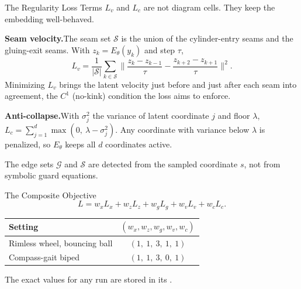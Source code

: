 \documentclass[10pt,aspectratio=169]{beamer}
\newcommand{\code}[1]{\texttt{\small\detokenize{#1}}}
\begin{document}
\begin{frame}{The Regularity Loss Terms}
  \small
  \(L_v\) and \(L_c\) are not diagram cells. They keep the embedding
  well-behaved.

  \medskip
  \textbf{Seam velocity.}\quad The seam set \(\mathcal{S}\) is the union of
  the cylinder-entry seams and the gluing-exit seams. With
  \(z_k = E_\theta(y_k)\) and step \(\tau\),
  \[ L_v = \frac{1}{|\mathcal{S}|}\sum_{k\in\mathcal{S}}
     \Big\lVert \frac{z_k - z_{k-1}}{\tau}
       - \frac{z_{k+2} - z_{k+1}}{\tau}\Big\rVert^2 . \]
  Minimizing \(L_v\) brings the latent velocity just before and just after
  each seam into agreement, the \(C^1\) (no-kink) condition the loss aims to
  enforce.

  \medskip
  \textbf{Anti-collapse.}\quad With \(\sigma_j^2\) the variance of latent
  coordinate \(j\) and floor \(\lambda\),
  \(\displaystyle L_c = \sum_{j=1}^{d}\max(0,\ \lambda - \sigma_j^2)\).
  Any coordinate with variance below \(\lambda\) is penalized, so \(E_\theta\)
  keeps all \(d\) coordinates active.

  \medskip
  The edge sets \(\mathcal{G}\) and \(\mathcal{S}\) are detected from the
  sampled coordinate \(s\), not from symbolic guard equations.
\end{frame}

\begin{frame}{The Composite Objective}
  \[
    L = w_x L_x + w_z L_z + w_g L_g + w_v L_v + w_c L_c.
  \]

  \vspace{0.8em}
  \begin{center}
  \begin{tabular}{lc}
    \toprule
    Setting & \((w_x, w_z, w_g, w_v, w_c)\) \\
    \midrule
    Rimless wheel, bouncing ball & \((1,\ 1,\ 3,\ 1,\ 1)\) \\
    Compass-gait biped & \((1,\ 1,\ 3,\ 0,\ 1)\) \\
    \bottomrule
  \end{tabular}
  \end{center}

  \vspace{0.8em}
  The exact values for any run are stored in its \code{config.json}.
\end{frame}
\end{document}

